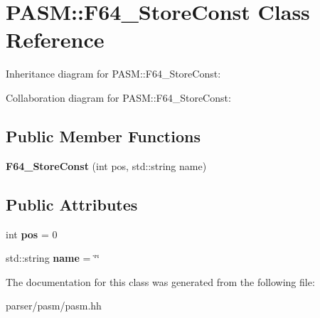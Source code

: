 \hypertarget{classPASM_1_1F64__StoreConst}{}\section{P\+A\+SM\+:\+:F64\+\_\+\+Store\+Const Class Reference}
\label{classPASM_1_1F64__StoreConst}


Inheritance diagram for P\+A\+SM\+:\+:F64\+\_\+\+Store\+Const\+:


Collaboration diagram for P\+A\+SM\+:\+:F64\+\_\+\+Store\+Const\+:
\subsection*{Public Member Functions}
\begin{DoxyCompactItemize}
\item 
\mbox{\label{classPASM_1_1F64__StoreConst_a2270fb2be2c6ebf89e0847365c65149a}} 
{\bfseries F64\+\_\+\+Store\+Const} (int pos, std\+::string name)
\end{DoxyCompactItemize}
\subsection*{Public Attributes}
\begin{DoxyCompactItemize}
\item 
\mbox{\label{classPASM_1_1F64__StoreConst_a3d269ded5b8b949d00b1422b6a9c72e1}} 
int {\bfseries pos} = 0
\item 
\mbox{\label{classPASM_1_1F64__StoreConst_a3aa40fc78d7e9a7101377ad38d6807dc}} 
std\+::string {\bfseries name} = \char`\"{}\char`\"{}
\end{DoxyCompactItemize}


The documentation for this class was generated from the following file\+:\begin{DoxyCompactItemize}
\item 
parser/pasm/pasm.\+hh\end{DoxyCompactItemize}
